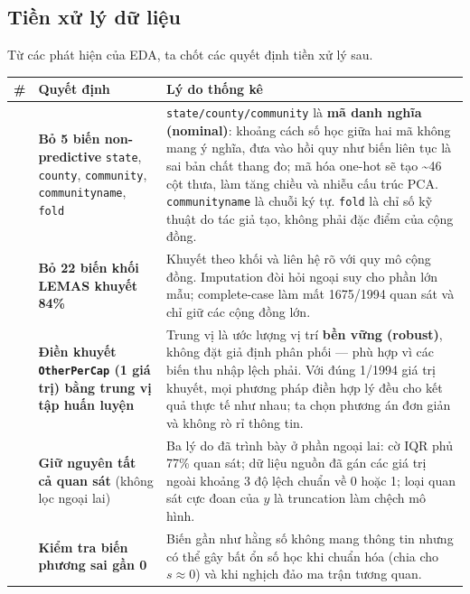 \subsection{Tiền xử lý dữ
liệu}\label{tiux1ec1n-xux1eed-luxfd-dux1eef-liux1ec7u}

Từ các phát hiện của EDA, ta chốt các quyết định tiền xử lý sau.

\begin{longtable}[]{@{}
  >{\raggedright\arraybackslash}p{}
  >{\raggedright\arraybackslash}p{}
  >{\raggedright\arraybackslash}p{}@{}}
\toprule\noalign{}
\begin{minipage}[b]{\linewidth}\raggedright
\#
\end{minipage} & \begin{minipage}[b]{\linewidth}\raggedright
Quyết định
\end{minipage} & \begin{minipage}[b]{\linewidth}\raggedright
Lý do thống kê
\end{minipage} \\
\midrule\noalign{}
\endhead
\bottomrule\noalign{}
\endlastfoot
1 & \textbf{Bỏ 5 biến non-predictive} \texttt{state}, \texttt{county},
\texttt{community}, \texttt{communityname}, \texttt{fold} &
\texttt{state/county/community} là \textbf{mã danh nghĩa (nominal)}:
khoảng cách số học giữa hai mã không mang ý nghĩa, đưa vào hồi quy như
biến liên tục là sai bản chất thang đo; mã hóa one-hot sẽ tạo
\textasciitilde46 cột thưa, làm tăng chiều và nhiễu cấu trúc PCA.
\texttt{communityname} là chuỗi ký tự. \texttt{fold} là chỉ số kỹ thuật
do tác giả tạo, không phải đặc điểm của cộng đồng. \\
2 & \textbf{Bỏ 22 biến khối LEMAS khuyết 84\%} & Khuyết theo khối và
liên hệ rõ với quy mô cộng đồng. Imputation đòi hỏi ngoại suy cho phần
lớn mẫu; complete-case làm mất 1675/1994 quan sát và chỉ giữ các cộng
đồng lớn. \\
3 & \textbf{Điền khuyết \texttt{OtherPerCap} (1 giá trị) bằng trung vị
tập huấn luyện} & Trung vị là ước lượng vị trí \textbf{bền vững
(robust)}, không đặt giả định phân phối --- phù hợp vì các biến thu nhập
lệch phải. Với đúng 1/1994 giá trị khuyết, mọi phương pháp điền hợp lý
đều cho kết quả thực tế như nhau; ta chọn phương án đơn giản và không rò
rỉ thông tin. \\
4 & \textbf{Giữ nguyên tất cả quan sát} (không lọc ngoại lai) & Ba lý do
đã trình bày ở phần ngoại lai: cờ IQR phủ 77\% quan sát; dữ liệu nguồn
đã gán các giá trị ngoài khoảng 3 độ lệch chuẩn về 0 hoặc 1; loại quan
sát cực đoan của \(y\) là truncation làm chệch mô hình. \\
5 & \textbf{Kiểm tra biến phương sai gần 0} & Biến gần như hằng số không
mang thông tin nhưng có thể gây bất ổn số học khi chuẩn hóa (chia cho
\(s \approx 0\)) và khi nghịch đảo ma trận tương quan. \\
\end{longtable}

